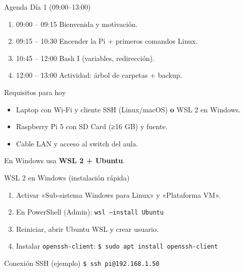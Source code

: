 \documentclass[aspectratio=169, professionalfonts]{beamer}
\begin{document}
\begin{frame}{Agenda Día 1 (09:00–13:00)}
  \begin{enumerate}
    \item 09:00 – 09:15  Bienvenida y motivación.
    \item 09:15 – 10:30  Encender la Pi + primeros comandos Linux.
    \item 10:45 – 12:00  Bash I (variables, redirección).
    \item 12:00 – 13:00  Actividad: árbol de carpetas + backup.
  \end{enumerate}
\end{frame}

\begin{frame}{Requisitos para hoy}
  \begin{itemize}
    \item Laptop con Wi-Fi y cliente SSH (Linux/macOS) \textbf{o} WSL 2 en Windows.
    \item Raspberry Pi 5 con SD Card (≥16 GB) y fuente.
    \item Cable LAN y acceso al switch del aula.
  \end{itemize}
  \alert{En Windows usa \textbf{WSL 2 + Ubuntu}.}
\end{frame}

\begin{frame}{WSL 2 en Windows (instalación rápida)}
  \begin{enumerate}
    \item Activar «Sub-sistema Windows para Linux» y «Plataforma VM».
    \item En PowerShell (Admin): \texttt{wsl --install Ubuntu}
    \item Reiniciar, abrir Ubuntu WSL y crear usuario.
    \item Instalar \texttt{openssh-client}:\newline
          \texttt{\$ sudo apt install openssh-client}
  \end{enumerate}
  \pause
  \begin{block}{Conexión SSH (ejemplo)}
\texttt{\$ ssh pi@192.168.1.50}
  \end{block}
\end{frame}
\end{document}
